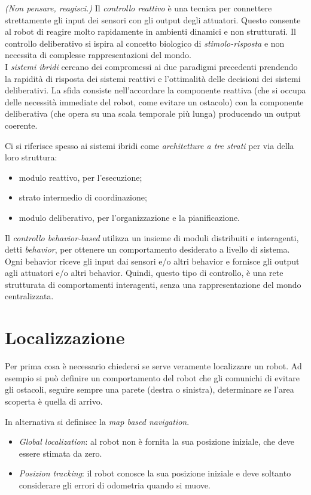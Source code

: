 \documentclass[a4paper,portrait,12pt]{article}
\theoremstyle{definition}
\begin{document}
\emph{(Non pensare, reagisci.)}
Il \emph{controllo reattivo} è una tecnica per connettere strettamente gli input dei sensori con gli output degli attuatori.
Questo consente al robot di reagire molto rapidamente in ambienti dinamici e non strutturati.
Il controllo deliberativo si ispira al concetto biologico di \emph{stimolo-risposta} e non necessita di complesse rappresentazioni del mondo.\\

I \emph{sistemi ibridi} cercano dei compromessi ai due paradigmi precedenti prendendo la rapidità di risposta dei sistemi reattivi e l'ottimalità delle decisioni dei sistemi deliberativi.
La sfida consiste nell'accordare la componente reattiva (che si occupa delle necessità immediate del robot, come evitare un ostacolo) con la componente deliberativa (che opera su una scala temporale più lunga) producendo un output coerente.

Ci si riferisce spesso ai sistemi ibridi come \emph{architetture a tre strati} per via della loro struttura:
\begin{itemize}
\item modulo reattivo, per l'esecuzione;
\item strato intermedio di coordinazione;
\item modulo deliberativo, per l'organizzazione e la pianificazione.
\end{itemize}

Il \emph{controllo behavior-based} utilizza un insieme di moduli distribuiti e interagenti, detti \emph{behavior}, per ottenere un comportamento desiderato a livello di sistema.
Ogni behavior riceve gli input dai sensori e/o altri behavior e fornisce gli output agli attuatori e/o altri behavior.
Quindi, questo tipo di controllo, è una rete strutturata di comportamenti interagenti, senza una rappresentazione del mondo centralizzata. 



\section{Localizzazione}

Per prima cosa è necessario chiedersi se serve veramente localizzare un robot.
Ad esempio si può definire un comportamento del robot che gli comunichi di evitare gli ostacoli, seguire sempre una parete (destra o sinistra), determinare se l'area scoperta è quella di arrivo.

In alternativa si definisce la \emph{map based navigation}.
\begin{itemize}
\item \emph{Global localization}: al robot non è fornita la sua posizione iniziale, che deve essere stimata da zero.
\item \emph{Posizion tracking}: il robot conosce la sua posizione iniziale e deve soltanto considerare gli errori di odometria quando si muove.
\end{itemize}
\end{document}
